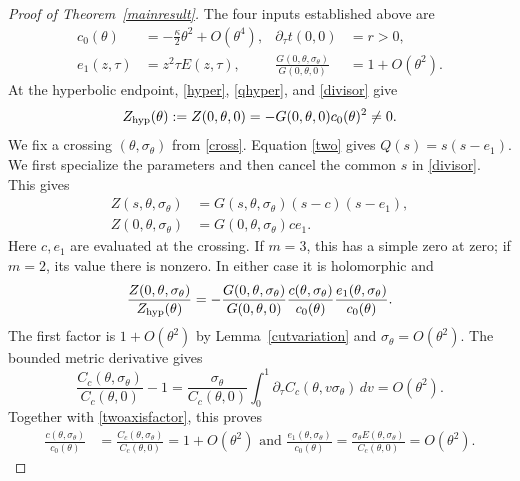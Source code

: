 \documentclass[11pt,letterpaper,reqno]{amsart}
\theoremstyle{remark}
\begin{document}
\begin{proof}[Proof of Theorem~\ref{mainresult}]
The four inputs established above are
\[
 \begin{aligned}
 c_0(\theta)&=-\tfrac\kappa2\theta^2+O(\theta^4),
 &\partial_\tau t(0,0)&=r>0,\\
 e_1(z,\tau)&=z^2\tau E(z,\tau),
 &\frac{G(0,\theta,\sigma_\theta)}{G(0,\theta,0)}&=1+O(\theta^2).
 \end{aligned}
\]
At the hyperbolic endpoint, \eqref{hyper}, \eqref{qhyper}, and
\eqref{divisor} give
\begin{equation}\label{hypervalue}
 Z_{\rm hyp}(\theta):=Z(0,\theta,0)
       =-G(0,\theta,0)c_0(\theta)^2\ne0.
\end{equation}
We fix a crossing $(\theta,\sigma_\theta)$ from \eqref{cross}.
Equation \eqref{two} gives $Q(s)=s(s-e_1)$. We first specialize the
parameters and then cancel the common $s$ in
\eqref{divisor}. This gives
\begin{equation}\label{specialized}
 \begin{aligned}
 Z(s,\theta,\sigma_\theta)
 &=G(s,\theta,\sigma_\theta)(s-c)(s-e_1),\\
 Z(0,\theta,\sigma_\theta)&=G(0,\theta,\sigma_\theta)c e_1.
 \end{aligned}
\end{equation}
Here $c,e_1$ are evaluated at the crossing. If $m=3$, this has
a simple zero at zero; if $m=2$, its value there is nonzero.
In either case it is holomorphic and
\begin{equation}\label{exactratio}
 \frac{Z(0,\theta,\sigma_\theta)}{Z_{\rm hyp}(\theta)}
 =-\frac{G(0,\theta,\sigma_\theta)}{G(0,\theta,0)}
   \frac{c(\theta,\sigma_\theta)}{c_0(\theta)}
   \frac{e_1(\theta,\sigma_\theta)}{c_0(\theta)}.
\end{equation}
The first factor is $1+O(\theta^2)$ by Lemma~\ref{cutvariation} and
$\sigma_\theta=O(\theta^2)$. The bounded metric derivative gives
\[
 \frac{C_c(\theta,\sigma_\theta)}{C_c(\theta,0)}-1
 =\frac{\sigma_\theta}{C_c(\theta,0)}
   \int_0^1\partial_\tau C_c(\theta,v\sigma_\theta)\,dv
 =O(\theta^2).
\]
Together with \eqref{twoaxisfactor}, this proves
\begin{equation}\label{coefficientratios}
 \begin{aligned}
 \frac{c(\theta,\sigma_\theta)}{c_0(\theta)}
 &=\frac{C_c(\theta,\sigma_\theta)}{C_c(\theta,0)}=1+O(\theta^2) \text{ and }
 \frac{e_1(\theta,\sigma_\theta)}{c_0(\theta)}
 =\frac{\sigma_\theta E(\theta,\sigma_\theta)}{C_c(\theta,0)}
   =O(\theta^2).

\end{aligned}
\end{equation}
\end{proof}
\end{document}
